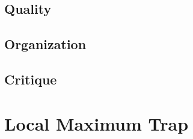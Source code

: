 

\subsection{Quality}


\subsection{Organization}


\subsection{Critique}



\section{Local Maximum Trap}



